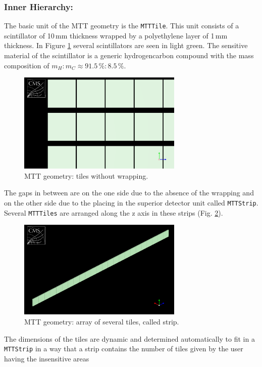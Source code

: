 			\subsubsection*{Inner Hierarchy:}
			The basic unit of the MTT geometry is the \verb+MTTTile+.
			This unit consists of a scintillator of 10\,mm thickness wrapped by a polyethylene layer of 1\,mm thickness.
			In Figure \ref{fig:tile_wowrapping} several scintillators are seen in light green.
			The sensitive material of the scintillator is a generic hydrogencarbon compound with the mass composition of $m_H:m_C \approx 91.5\,\%:8.5\,\%$.
			\begin{figure}[htbp]
				\centering
				\includegraphics[width=0.70\textwidth]{Figures/erdogan/tile_wowrapping.png}
				\caption{MTT geometry: tiles without wrapping.}
				\label{fig:tile_wowrapping}
			\end{figure}
			The gaps in between are on the one side due to the absence of the wrapping and on the other side due to the placing in the superior detector unit called \verb+MTTStrip+.
			Several \verb+MTTTiles+ are arranged along the z axis in these strips (Fig. \ref{fig:strip}).
			\begin{figure}[htbp]
				\centering
				\includegraphics[width=0.70\textwidth]{Figures/erdogan/strip.png}
				\caption{MTT geometry: array of several tiles, called strip.}
				\label{fig:strip}
			\end{figure}
			The dimensions of the tiles are dynamic and determined automatically to fit in a \verb+MTTStrip+ in a way that a strip contains the number of tiles given by the user having the insensitive areas
